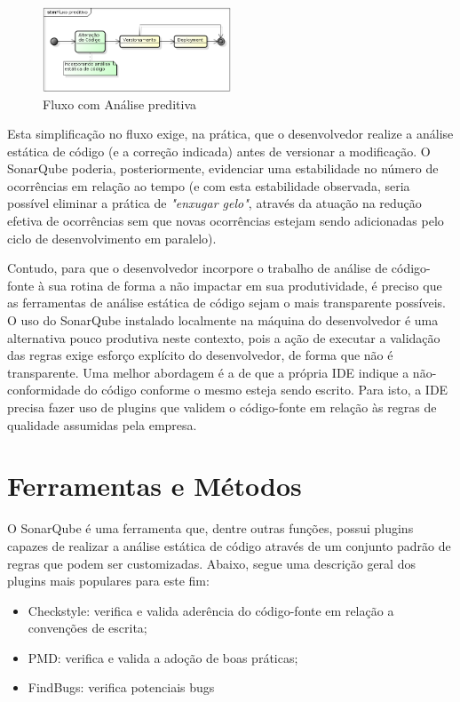 \documentclass[12pt,journal,compsoc]{IEEEtran}
\begin{document}
\begin{figure}[ht!]
\centering
\includegraphics[width=0.5\textwidth]{img/flow_after}
\caption{Fluxo com Análise preditiva}
\label{flow_after}
\end{figure}

Esta simplificação no fluxo exige, na prática, que o desenvolvedor realize a análise estática de código (e a correção indicada) antes de versionar a modificação. O SonarQube poderia, posteriormente, evidenciar uma estabilidade no número de ocorrências em relação ao tempo (e com esta estabilidade observada, seria possível eliminar a prática de \emph{"enxugar gelo"}, através da atuação na redução efetiva de ocorrências sem que novas ocorrências estejam sendo adicionadas pelo ciclo de desenvolvimento em paralelo). 

Contudo, para que o desenvolvedor incorpore o trabalho de análise de código-fonte à sua rotina de forma a não impactar em sua produtividade, é preciso que as ferramentas de análise estática de código sejam o mais transparente possíveis. O uso do SonarQube instalado localmente na máquina do desenvolvedor é uma alternativa pouco produtiva neste contexto, pois a ação de executar a validação das regras exige esforço explícito do desenvolvedor, de forma que não é transparente. Uma melhor abordagem é a de que a própria IDE indique a não-conformidade do código conforme o mesmo esteja sendo escrito. Para isto, a IDE precisa fazer uso de plugins que validem o código-fonte em relação às regras de qualidade assumidas pela empresa. 


\section{Ferramentas e Métodos}

O SonarQube é uma ferramenta que, dentre outras funções, possui plugins capazes de realizar a análise estática de código através de um conjunto padrão de regras que podem ser customizadas. Abaixo, segue uma descrição geral dos plugins mais populares para este fim:

\begin{itemize}
\item Checkstyle: verifica e valida aderência do código-fonte em relação a convenções de escrita;
\item PMD: verifica e valida a adoção de boas práticas;
\item FindBugs: verifica potenciais bugs
\end{itemize}
\end{document}
